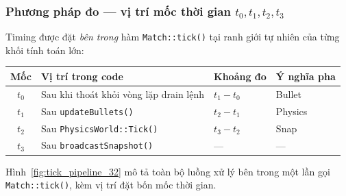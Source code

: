 \documentclass[12pt,a4paper]{report}
\begin{document}
\subsubsection*{Phương pháp đo --- vị trí mốc thời gian \texorpdfstring{$t_0, t_1, t_2, t_3$}{t0,t1,t2,t3}}

Timing được đặt \emph{bên trong} hàm \texttt{Match::tick()} tại ranh giới tự
nhiên của từng khối tính toán lớn:

\begin{center}
\begin{tabular}{clll}
\toprule
Mốc & Vị trí trong code & Khoảng đo & Ý nghĩa pha \\
\midrule
$t_0$ & Sau khi thoát khỏi vòng lặp drain lệnh & $t_1 - t_0$ & Bullet \\
$t_1$ & Sau \texttt{updateBullets()} & $t_2 - t_1$ & Physics \\
$t_2$ & Sau \texttt{PhysicsWorld::Tick()} & $t_3 - t_2$ & Snap \\
$t_3$ & Sau \texttt{broadcastSnapshot()} & --- & --- \\
\bottomrule
\end{tabular}
\end{center}

Hình~\ref{fig:tick_pipeline_32} mô tả toàn bộ luồng xử lý bên trong một lần gọi
\texttt{Match::tick()}, kèm vị trí đặt bốn mốc thời gian.
\end{document}
